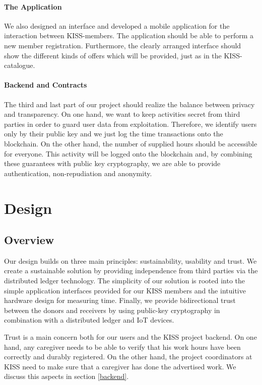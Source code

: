 \documentclass[12pt]{report}
\begin{document}
\subsubsection{The Application}
We also designed an interface and developed a mobile application for the interaction between KISS-members. The application should be able to perform a new member registration. Furthermore, the clearly arranged interface should show the different kinds of offers which will be provided, just as in the KISS-catalogue.

\subsubsection{Backend and Contracts}
The third and last part of our project should realize the balance between privacy and transparency. On one hand, we want to keep activities secret from third parties in order to guard user data from exploitation. Therefore, we identify users only by their public key and we just log the time transactions onto the blockchain. On the other hand, the number of supplied hours should be accessible for everyone. This activity will be logged onto the blockchain and, by combining these guarantees with public key cryptography, we are able to provide authentication, non-repudiation and anonymity.

\chapter{Design}

\section{Overview}
Our design builds on three main principles: sustainability, usability and trust. We create a sustainable solution by providing independence from third parties via the distributed ledger technology. The simplicity of our solution is rooted into the simple application interfaces provided for our KISS members and the intuitive hardware design for measuring time. Finally, we provide bidirectional trust between the donors and receivers by using public-key cryptography in combination with a distributed ledger and IoT devices.

Trust is a main concern both for our users and the KISS project backend. On one hand, any caregiver needs to be able to verify that his work hours have been correctly and durably registered. On the other hand, the project coordinators at KISS need to make sure that a caregiver has done the advertised work. We discuss this aspects in section \ref{backend}.
\end{document}
